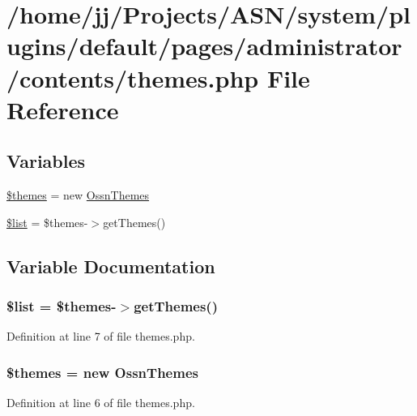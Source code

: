 \hypertarget{themes_8php}{}\section{/home/jj/\+Projects/\+A\+S\+N/system/plugins/default/pages/administrator/contents/themes.php File Reference}
\label{themes_8php}
\subsection*{Variables}
\begin{DoxyCompactItemize}
\item 
\hyperlink{themes_8php_ab8a3a0009c9eedf2350ba849c39c0580}{\$themes} = new \hyperlink{class_ossn_themes}{Ossn\+Themes}
\item 
\hyperlink{themes_8php_a358b00350db3d8f227d500337cc437af}{\$list} = \$themes-\/$>$get\+Themes()
\end{DoxyCompactItemize}


\subsection{Variable Documentation}
\subsubsection[{\texorpdfstring{\$list}{$list}}]{\setlength{\rightskip}{0pt plus 5cm}\$list = \$themes-\/$>$get\+Themes()}\hypertarget{themes_8php_a358b00350db3d8f227d500337cc437af}{}\label{themes_8php_a358b00350db3d8f227d500337cc437af}


Definition at line 7 of file themes.\+php.

\subsubsection[{\texorpdfstring{\$themes}{$themes}}]{\setlength{\rightskip}{0pt plus 5cm}\$themes = new {\bf Ossn\+Themes}}\hypertarget{themes_8php_ab8a3a0009c9eedf2350ba849c39c0580}{}\label{themes_8php_ab8a3a0009c9eedf2350ba849c39c0580}


Definition at line 6 of file themes.\+php.

